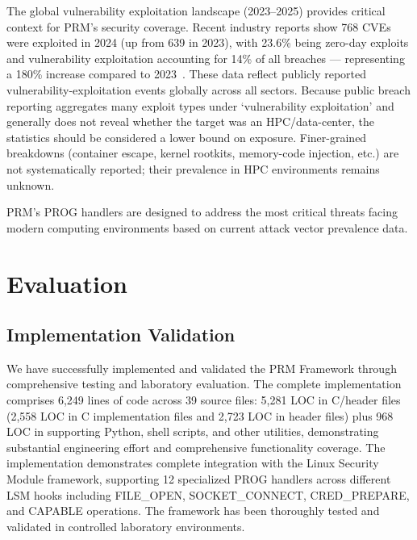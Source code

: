 \documentclass[]{sn-jnl}
\begin{document}
The global vulnerability exploitation landscape (2023--2025) provides critical
context for PRM's security coverage. Recent industry reports show 768 CVEs were
exploited in 2024 (up from 639 in 2023), with 23.6\% being zero-day exploits and
vulnerability exploitation accounting for 14\% of all breaches --- representing a
180\% increase compared to
2023~\cite{vulncheck2024trends,verizon2024dbir}. These data reflect publicly
reported vulnerability-exploitation events globally across all sectors. Because
public breach reporting aggregates many exploit types under `vulnerability
exploitation' and generally does not reveal whether the target was an HPC/data-center,
the statistics should be considered a lower bound on exposure. Finer-grained
breakdowns (container escape, kernel rootkits, memory-code injection, etc.) are
not systematically reported; their prevalence in HPC environments remains unknown.

PRM's PROG handlers are designed to address the most critical threats facing
modern computing environments based on current attack vector prevalence data.

\section{Evaluation}
\label{sec:evaluation}

\subsection{Implementation Validation}

We have successfully implemented and validated the PRM Framework through
comprehensive testing and laboratory evaluation. The complete implementation
comprises 6,249 lines of code across 39 source files: 5,281 LOC in C/header
files (2,558 LOC in C implementation files and 2,723 LOC in header files) plus
968 LOC in supporting Python, shell scripts, and other utilities, demonstrating
substantial engineering effort and comprehensive functionality coverage. The
implementation demonstrates complete integration with the Linux Security Module
framework, supporting 12 specialized PROG handlers across different LSM hooks
including FILE\_OPEN, SOCKET\_CONNECT, CRED\_PREPARE, and CAPABLE operations.
The framework has been thoroughly tested and validated in controlled laboratory
environments.
\end{document}
